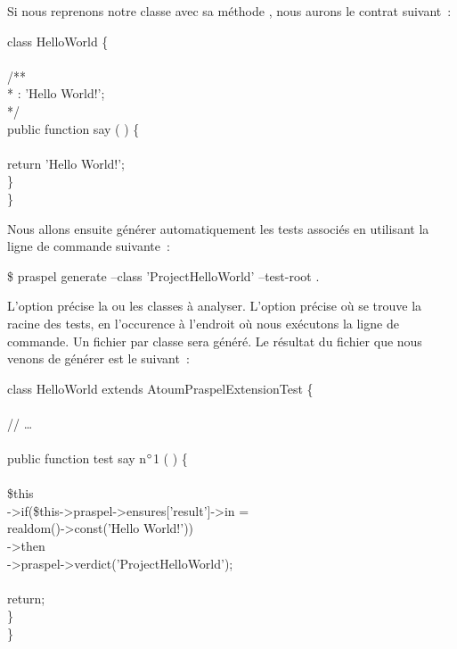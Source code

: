 Si nous reprenons notre classe  avec sa méthode
, nous aurons le contrat suivant~:
%
\begin{pre}
class HelloWorld \{ \\
 \\
    /** \\
     * \aensures \aresult: 'Hello World!'; \\
     */ \\
    public function say ( ) \{ \\
 \\
        return 'Hello World!'; \\
    \} \\
\}
\end{pre}
%
Nous allons ensuite générer automatiquement les tests associés en utilisant la
ligne de commande suivante~:
%
\begin{pre}
\$ praspel generate --class 'Project\bslash{}HelloWorld' --test-root .
\end{pre}
%
L'option  précise la ou les classes à analyser. L'option
 précise où se trouve la racine des tests, en
l'occurence à l'endroit où nous exécutons la ligne de commande. Un fichier par
classe sera généré. Le résultat du fichier que nous venons de générer est le
suivant~:

\begin{bigpre}
class HelloWorld extends \bslash{}Atoum\bslash{}PraspelExtension\bslash{}Test \{ \\
 \\
    // … \\
 \\
    public function test say n\(\sp{\circ}\)1 ( ) \{ \\
 \\
        \$this \\
            ->if(\$this->praspel->ensures['\bslash{}result']->in = \\
                realdom()->const('Hello World!')) \\
            ->then \\
                ->praspel->verdict('\bslash{}Project\bslash{}HelloWorld');  \\
 \\
        return; \\
    \} \\
\}
\end{bigpre}

